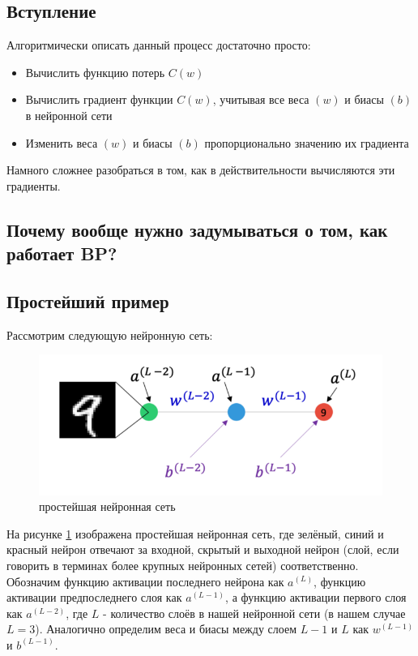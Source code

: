 \documentclass[a4paper, 10pt, openany]{book} %
\begin{document}
	\subsection{Вступление}
	
	Алгоритмически описать данный процесс достаточно просто:
	
	\begin{itemize}
		\item Вычислить функцию потерь $C(w)$
		\item Вычислить градиент функции $C(w)$, учитывая все веса $(w)$ и биасы $(b)$ в нейронной сети
		\item Изменить веса $(w)$ и биасы $(b)$ пропорционально значению их градиента
	\end{itemize}
	
	Намного сложнее разобраться в том, как в действительности вычисляются эти градиенты.
	
	\subsection{Почему вообще нужно задумываться о том, как работает BP?}
	
	\subsection{Простейший пример}
	
	Рассмотрим следующую нейронную сеть:
	
	\begin{figure}[h!]
		\centering
		\includegraphics[width=\linewidth]{pictures/backpropagation/1-1-1_network.png}
		\caption{простейшая нейронная сеть}
		\label{simplest_nn}
	\end{figure}
	
	На рисунке \ref{simplest_nn} изображена простейшая нейронная сеть, где зелёный, синий и красный нейрон отвечают за входной, скрытый и выходной нейрон (слой, если говорить в терминах более крупных нейронных сетей) соответственно. Обозначим функцию активации последнего нейрона как $a^{(L)}$, функцию активации предпоследнего слоя как $a^{(L-1)}$, а функцию активации первого слоя как $a^{(L-2)}$, где $L$ - количество слоёв в нашей нейронной сети (в нашем случае $L=3$). Аналогично определим веса и биасы между слоем $L-1$ и $L$ как $w^{(L-1)}$ и $b^{(L-1)}$.
	
\end{document}
